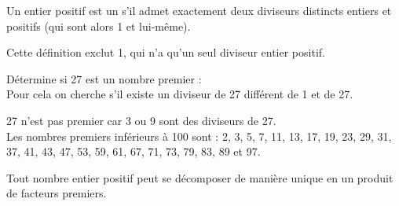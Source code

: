  

\begin{methode*1}

\begin{aconnaitre}
Un entier positif est un  s'il admet exactement deux diviseurs distincts entiers et positifs (qui sont alors 1 et lui-même).
\end{aconnaitre}

\begin{remarque}
Cette définition exclut 1, qui n'a qu'un seul diviseur entier positif.
 \end{remarque}
 
 \begin{exemple*1}
 Détermine si 27 est un nombre premier : \\[1em]
 Pour cela on cherche s'il existe un diviseur de 27 différent de 1 et de 27.
 
27 n'est pas premier car 3 ou 9 sont des diviseurs de 27. \\[1em]
  \textcolor{A1}{Les nombres premiers inférieurs à 100 sont : 2, 3, 5, 7, 11, 13, 17, 19, 23, 29, 31, 37, 41, 43, 47, 53, 59, 61, 67, 71, 73, 79, 83, 89 et 97.}
  \end{exemple*1}

\begin{aconnaitre}
Tout nombre entier positif peut se décomposer de manière unique en un produit de facteurs premiers.
\end{aconnaitre}


\end{methode*1}
